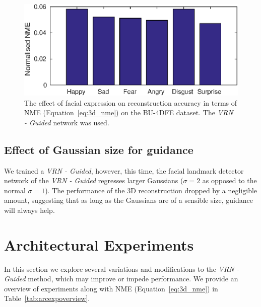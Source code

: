 \begin{figure}
  \centering
  \includegraphics[width=0.7\linewidth]{curves/ablation_expression.eps}
  \caption[Effect of facial expressions]{The effect of facial
    expression on reconstruction accuracy in terms of NME
    (Equation~\ref{eq:3d_nme}) on the BU-4DFE dataset. The \textit{VRN
      - Guided} network was used.}
  \label{fig:effect_expression}
\end{figure}

\subsection{Effect of Gaussian size for guidance} We trained a
\textit{VRN - Guided}, however, this time, the facial landmark
detector network of the \textit{VRN - Guided} regresses larger
Gaussians ($\sigma = 2$ as opposed to the normal $\sigma = 1$). The
performance of the 3D reconstruction dropped by a negligible amount,
suggesting that as long as the Gaussians are of a sensible size,
guidance will always help.

\section{Architectural Experiments}
\label{sec:arcexp}

In this section we explore several variations and modifications to the
\textit{VRN - Guided} method, which may improve or impede
performance. We provide an overview of experiments along with NME
(Equation~\ref{eq:3d_nme}) in Table~\ref{tab:arcexpoverview}.

